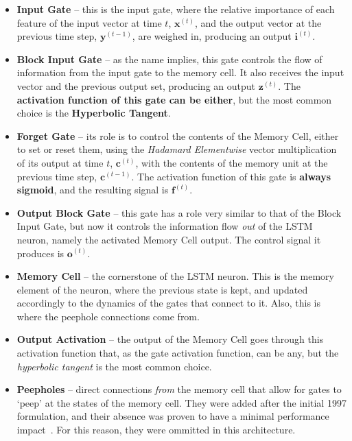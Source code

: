 \documentclass{IEEEtran}
\newcommand{\mb}[1]{\mathbf{#1}}
\begin{document}
\begin{itemize}
    \item \textbf{Input Gate} -- this is the input gate, where the relative importance of each feature of 
the input vector at time $t$, $\mb{x}^{(t)}$, and the output vector at the previous time step, $\mb{y}^{(t-1)}$, 
are weighed in, producing an output $\mb{i}^{(t)}$.

    \item \textbf{Block Input Gate} -- as the name implies, this gate controls the flow of information 
from the input gate to the memory cell. It also receives the input vector and the previous output 
set, producing an output $\mb{z}^{(t)}$. The \textbf{activation function of this gate can be either}, 
but the most common choice is the \textbf{Hyperbolic Tangent}.

    \item \textbf{Forget Gate} -- its role is to control the contents of the Memory Cell, either to 
set or reset them, using the \textit{Hadamard Elementwise} vector multiplication of its output at time 
$t$, $\mb{c}^{(t)}$, with the contents of the memory unit at the previous time step, $\mb{c}^{(t-1)}$. 
The activation function of this gate is \textbf{always sigmoid}, and the resulting signal is $\mb{f}^{(t)}$.

    \item \textbf{Output Block Gate} -- this gate has a role very similar to that of the Block Input 
Gate, but now it controls the information flow \textit{out} of the LSTM neuron, namely the activated 
Memory Cell output. The control signal it produces is $\mb{o}^{(t)}$.

    \item \textbf{Memory Cell} -- the cornerstone of the LSTM neuron. This is the memory element of 
the neuron, where the previous state is kept, and updated accordingly to the dynamics of the gates 
that connect to it. Also, this is where the peephole connections come from. 

    \item \textbf{Output Activation} -- the output of the Memory Cell goes through this activation 
function that, as the gate activation function, can be any, but the \textit{hyperbolic tangent} 
is the most common choice.

    \item \textbf{Peepholes} -- direct connections \textit{from} the memory cell that allow for gates 
to `peep' at the states of the memory cell. They were added after the initial 1997 formulation, and their 
absence was proven to have a minimal performance impact~\cite{Greff15}. For this reason, they were ommitted 
in this architecture. 

\end{itemize}
\end{document}
